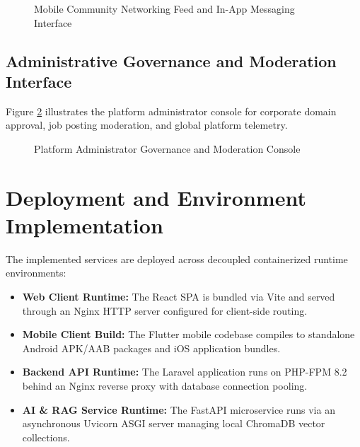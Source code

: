 \begin{figure}[h!]
\centering
{}
\caption{Mobile Community Networking Feed and In-App Messaging Interface}
\label{fig:gui_messaging_feed}
\end{figure}

\subsection{Administrative Governance and Moderation Interface}
Figure \ref{fig:gui_admin_console} illustrates the platform administrator console for corporate domain approval, job posting moderation, and global platform telemetry.

\begin{figure}[h!]
\centering
{}
\caption{Platform Administrator Governance and Moderation Console}
\label{fig:gui_admin_console}
\end{figure}

\section{Deployment and Environment Implementation}
The implemented services are deployed across decoupled containerized runtime environments:
\begin{itemize}
    \item \textbf{Web Client Runtime:} The React SPA is bundled via Vite and served through an Nginx HTTP server configured for client-side routing.
    \item \textbf{Mobile Client Build:} The Flutter mobile codebase compiles to standalone Android APK/AAB packages and iOS application bundles.
    \item \textbf{Backend API Runtime:} The Laravel application runs on PHP-FPM 8.2 behind an Nginx reverse proxy with database connection pooling.
    \item \textbf{AI & RAG Service Runtime:} The FastAPI microservice runs via an asynchronous Uvicorn ASGI server managing local ChromaDB vector collections.
\end{itemize}

